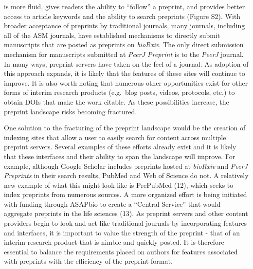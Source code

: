 \documentclass[11,]{article}
\begin{document}
is more fluid, gives readers the ability to ``follow'' a preprint, and
provides better access to article keywords and the ability to search
preprints (Figure S2). With broader acceptance of preprints by
traditional journals, many journals, including all of the ASM journals,
have established mechanisms to directly submit manuscripts that are
posted as preprints on \emph{bioRxiv}. The only direct submission
mechanism for manuscripts submitted at \emph{PeerJ Preprint} is to the
\emph{PeerJ} journal. In many ways, preprint servers have taken on the
feel of a journal. As adoption of this approach expands, it is likely
that the features of these sites will continue to improve. It is also
worth noting that numerous other opportunities exist for other forms of
interim research products (e.g.~blog posts, videos, protocols, etc.) to
obtain DOIs that make the work citable. As these possibilities increase,
the preprint landscape risks becoming fractured.

One solution to the fracturing of the preprint landscape would be the
creation of indexing sites that allow a user to easily search for
content across multiple preprint servers. Several examples of these
efforts already exist and it is likely that these interfaces and their
ability to span the landscape will improve. For example, although Google
Scholar includes preprints hosted at \emph{bioRxiv} and \emph{PeerJ
Preprints} in their search results, PubMed and Web of Science do not. A
relatively new example of what this might look like is PrePubMed (12),
which seeks to index preprints from numerous sources. A more organized
effort is being initiated with funding through ASAPbio to create a
``Central Service'' that would aggregate preprints in the life sciences
(13). As preprint servers and other content providers begin to look and
act like traditional journals by incorporating features and interfaces,
it is important to value the strength of the preprint - that of an
interim research product that is nimble and quickly posted. It is
therefore essential to balance the requirements placed on authors for
features associated with preprints with the efficiency of the preprint
format.
\end{document}
